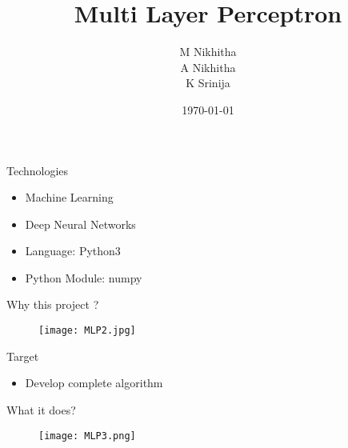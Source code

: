 \documentclass{beamer}
\title{Multi Layer Perceptron }
\author{ M Nikhitha \\ A Nikhitha \\ K Srinija}
\institute[WE]{ TalentSprint - WE program }
\date{\today}
\begin{document}
\begin{frame}
  \titlepage
\end{frame}


\begin{frame}{Technologies}
\begin{itemize}
  \item Machine Learning
  \item Deep Neural Networks
  \item Language: Python3
  \item Python Module: numpy
\end{itemize}
\end{frame}

\begin{frame}{Why this project ?}
\begin{figure}
    \texttt{[image: MLP2.jpg]}
\end{figure}
\end{frame}

\begin{frame}{Target}
\begin{itemize}
  \item Develop complete algorithm 
\end{itemize}
\end{frame}

\begin{frame}{What it does?}
\begin{figure}
    \texttt{[image: MLP3.png]}
\end{figure}
\end{frame}

    
    
\end{document}
